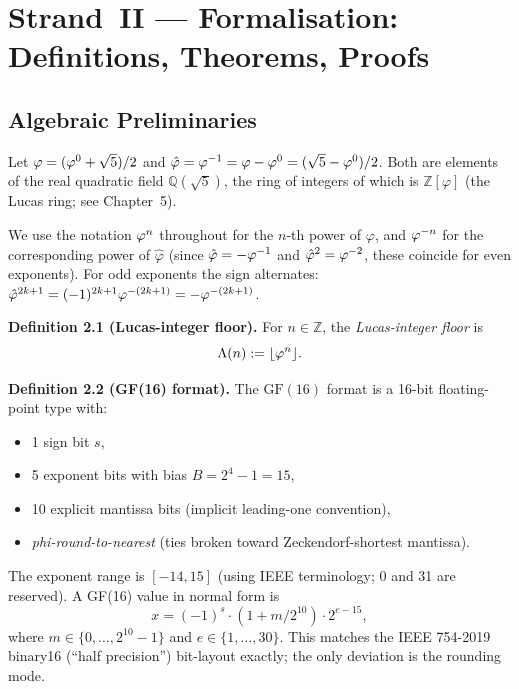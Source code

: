 
\section{Strand~II — Formalisation: Definitions, Theorems, Proofs}
\label{sec:strand-ii-formalisation}

\subsection{Algebraic Preliminaries}
\label{ssec:alg-prelim}

Let \(\varphi = (\varphi^{0}+\sqrt{5})/2\) and
\(\hat\varphi = \varphi^{-1} = \varphi - \varphi^{0} = (\sqrt{5} -
\varphi^{0})/2\).  Both are elements of the real quadratic field
\(\mathbb{Q}(\sqrt{5})\), the ring of integers of which is
\(\mathbb{Z}[\varphi]\) (the Lucas ring; see Chapter~5).

We use the notation \(\varphi^{n}\) throughout for the \(n\)-th power
of \(\varphi\), and \(\varphi^{-n}\) for the corresponding power of
\(\hat\varphi\) (since \(\hat\varphi = -\varphi^{-1}\) and
\(\hat\varphi^2 = \varphi^{-2}\), these coincide for even exponents).
For odd exponents the sign alternates:
\(\hat\varphi^{2k+1} = (-1)^{2k+1}\varphi^{-(2k+1)} = -\varphi^{-(2k+1)}\).

\textbf{Definition 2.1 (Lucas-integer floor).}
For \(n \in \mathbb{Z}\), the \emph{Lucas-integer floor} is
\[
  \Lambda(n) := \lfloor \varphi^{n} \rfloor.
\]

\textbf{Definition 2.2 (GF(16) format).}
The \(\mathrm{GF}(16)\) format is a 16-bit floating-point type with:
\begin{itemize}
  \item 1 sign bit \(s\),
  \item 5 exponent bits with bias \(B = 2^4 - 1 = 15\),
  \item 10 explicit mantissa bits (implicit leading-one convention),
  \item \emph{phi-round-to-nearest} (ties broken toward Zeckendorf-shortest mantissa).
\end{itemize}
The exponent range is \([-14, 15]\) (using IEEE terminology; 0 and 31
are reserved).  A GF(16) value in normal form is
\[
  x = (-1)^s \cdot (1 + m/2^{10}) \cdot 2^{e - 15},
\]
where \(m \in \{0,\ldots,2^{10}-1\}\) and \(e \in \{1,\ldots,30\}\).
This matches the IEEE 754-2019 binary16 (``half precision'')
bit-layout exactly; the only deviation is the rounding mode.

